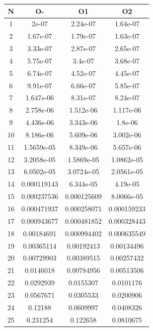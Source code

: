 \begin{center}
\begin{tabular}{| c | c | c | c |}
\hline
\textbf{N} & \textbf{O-} & \textbf{O1} & \textbf{O2} \\ \hline
1 & 2e-07 & 2.24e-07 & 1.64e-07 \\ \hline
2 & 1.67e-07 & 1.79e-07 & 1.63e-07 \\ \hline
3 & 3.33e-07 & 2.87e-07 & 2.65e-07 \\ \hline
4 & 5.75e-07 & 3.4e-07 & 3.68e-07 \\ \hline
5 & 6.74e-07 & 4.52e-07 & 4.45e-07 \\ \hline
6 & 9.91e-07 & 6.66e-07 & 5.85e-07 \\ \hline
7 & 1.647e-06 & 8.31e-07 & 8.24e-07 \\ \hline
8 & 2.758e-06 & 1.512e-06 & 1.117e-06 \\ \hline
9 & 4.436e-06 & 3.343e-06 & 1.8e-06 \\ \hline
10 & 8.186e-06 & 5.609e-06 & 3.002e-06 \\ \hline
11 & 1.5659e-05 & 8.349e-06 & 5.657e-06 \\ \hline
12 & 3.2058e-05 & 1.5869e-05 & 1.0862e-05 \\ \hline
13 & 6.0502e-05 & 3.0724e-05 & 2.0561e-05 \\ \hline
14 & 0.000119143 & 6.344e-05 & 4.19e-05 \\ \hline
15 & 0.000237536 & 0.000125609 & 8.0066e-05 \\ \hline
16 & 0.000471937 & 0.000258071 & 0.000159233 \\ \hline
17 & 0.000943677 & 0.000481852 & 0.000328443 \\ \hline
18 & 0.00184691 & 0.000994402 & 0.000635549 \\ \hline
19 & 0.00365114 & 0.00192413 & 0.00134496 \\ \hline
20 & 0.00729903 & 0.00389515 & 0.00257432 \\ \hline
21 & 0.0146018 & 0.00784956 & 0.00513506 \\ \hline
22 & 0.0292939 & 0.0155307 & 0.0101176 \\ \hline
23 & 0.0567671 & 0.0305533 & 0.0200906 \\ \hline
24 & 0.12188 & 0.0609997 & 0.0408326 \\ \hline
25 & 0.231254 & 0.122658 & 0.0810675 \\ \hline
\hline
\end{tabular}
\end{center}

